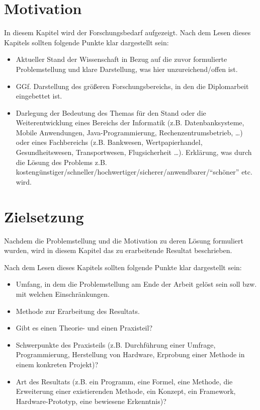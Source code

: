 \section{Motivation}

In diesem Kapitel wird der Forschungsbedarf aufgezeigt. Nach dem Lesen dieses Kapitels sollten folgende Punkte klar dargestellt sein:
\begin{itemize}
	\item Aktueller Stand der Wissenschaft in Bezug auf die zuvor formulierte Problemstellung und klare Darstellung, was hier unzureichend/offen ist.
	\item GGf. Darstellung des größeren Forschungsbereichs, in den die Diplomarbeit eingebettet ist.
	\item Darlegung der Bedeutung des Themas für den Stand oder die Weiterentwicklung eines Bereichs der Informatik (z.B. Datenbanksysteme, Mobile Anwendungen, Java-Programmierung, Rechenzentrumsbetrieb, \dots) oder eines Fachbereichs (z.B. Bankwesen, Wertpapierhandel, Gesundheitswesen, Transportwesen, Flugsicherheit \dots). Erklärung, was durch die Lösung des Problems z.B. kostengünstiger/schneller/hochwertiger/sicherer/anwendbarer/\enquote{schöner} etc. wird.
\end{itemize}

\section{Zielsetzung}

Nachdem die Problemstellung und die Motivation zu deren Lösung formuliert wurden, wird in diesem Kapitel das zu erarbeitende Resultat beschrieben.

\makeatletter\ifthesis@masterthesis
Nach dem Lesen dieses Kapitels sollten folgende Punkte klar dargestellt sein:
\begin{itemize}
	\item Umfang, in dem die Problemstellung am Ende der Arbeit gelöst sein soll bzw. mit welchen Einschränkungen.
	\item Methode zur Erarbeitung des Resultats.
	\item Gibt es einen Theorie- und einen Praxisteil?
	\item Schwerpunkte des Praxisteils (z.B. Durchführung einer Umfrage, Programmierung, Herstellung von Hardware, Erprobung einer Methode in einem konkreten Projekt)?
	\item Art des Resultats (z.B. ein Programm, eine Formel, eine Methode, die Erweiterung einer existierenden Methode, ein Konzept, ein Framework, Hardware-Prototyp, eine bewiesene Erkenntnis)?
\end{itemize}
\fi\makeatother


